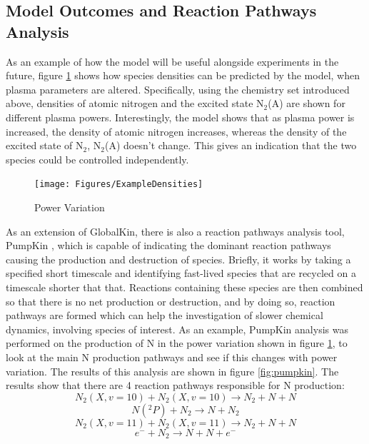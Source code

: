 \documentclass[11pt, oneside]{article}   	%
\begin{document}
\subsection{Model Outcomes and Reaction Pathways Analysis}

As an example of how the model will be useful alongside experiments in the future, figure \ref{fig:ExamplePowerVar} shows how species densities can be predicted by the model, when plasma parameters are altered.
Specifically, using the chemistry set introduced above, densities of atomic nitrogen and the excited state N$_2$(A) are shown for different plasma powers.
Interestingly, the model shows that as plasma power is increased, the density of atomic nitrogen increases, whereas the density of the excited state of N$_2$, N$_2$(A) doesn't change.
This gives an indication that the two species could be controlled independently.

\begin{figure}
\texttt{[image: Figures/ExampleDensities]}
\caption{Power Variation}
\label{fig:ExamplePowerVar}
\end{figure}


As an extension of GlobalKin, there is also a reaction pathways analysis tool, PumpKin \cite{Markosyan2014pumpkin}, which is capable of indicating the dominant reaction pathways causing the production and destruction of species.
Briefly, it works by taking a specified short timescale and identifying fast-lived species that are recycled on a timescale shorter that that.
Reactions containing these species are then combined so that there is no net production or destruction, and by doing so, reaction pathways are formed which can help the investigation of slower chemical dynamics, involving species of interest.
As an example, PumpKin analysis was performed on the production of N in the power variation shown in figure \ref{fig:ExamplePowerVar}, to look at the main N production pathways and see if this changes with power variation.
The results of this analysis are shown in figure \ref{fig:pumpkin}.
The results show that there are 4 reaction pathways responsible for N production:
\begin{equation}
N_2(X, v=10) + N_2(X, v=10) \rightarrow N_2 + N + N
\label{eqn1}
\end{equation}
\begin{equation}
N(^2P) + N_2 \rightarrow N + N_2
\label{eqn2}
\end{equation}
\begin{equation}
N_2(X, v=11) + N_2(X, v=11) \rightarrow N_2 + N + N
\label{eqn3}
\end{equation}
\begin{equation}
e^- + N_2 \rightarrow  N + N + e^-
\label{eqn4}
\end{equation}
\end{document}
